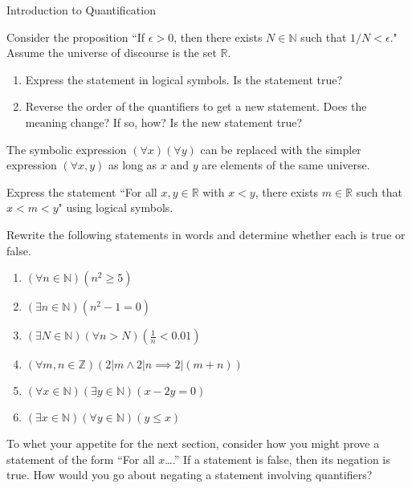 \begin{section}{Introduction to Quantification}
\begin{problem}
Consider the proposition ``If $\epsilon >0$, then there exists $N\in\mathbb{N}$ such that $1/N<\epsilon$."  Assume the universe of discourse is the set $\mathbb{R}$.
\begin{enumerate}[label=\textrm{(\alph*)}]
\item Express the statement in logical symbols. Is the statement true?
\item Reverse the order of the quantifiers to get a new statement. Does the meaning change?  If so, how?  Is the new statement true?
\end{enumerate}
\end{problem}

The symbolic expression $(\forall x)(\forall y)$ can be replaced with the simpler expression $(\forall x,y)$ as long as $x$ and $y$ are elements of the same universe.

\begin{problem}
Express the statement ``For all $x,y\in\mathbb{R}$ with $x<y$, there exists $m\in\mathbb{R}$ such that $x<m<y$" using logical symbols.
\end{problem}

\begin{problem}
Rewrite the following statements in words and determine whether each is true or false.
\begin{enumerate}[label=\textrm{(\alph*)}]
\item $(\forall n \in \mathbb{N})(n^2 \geq 5)$
\item $(\exists n \in \mathbb{N})(n^2-1=0)$
\item $(\exists N \in \mathbb{N})(\forall  n > N)(\frac{1}{n} < 0.01)$
\item $(\forall m, n \in \mathbb{Z})(2|m \wedge 2|n \implies 2|(m+n))$
\item $(\forall x \in \mathbb{N})(\exists y \in \mathbb{N})(x-2y=0)$
\item $(\exists x \in \mathbb{N})(\forall y \in \mathbb{N})(y \leq x)$
\end{enumerate}
\end{problem}

To whet your appetite for the next section, consider how you might prove a statement of the form ``For all $x$\ldots.'' If a statement is false, then its negation is true. How would you go about negating a statement involving quantifiers? 

\end{section}